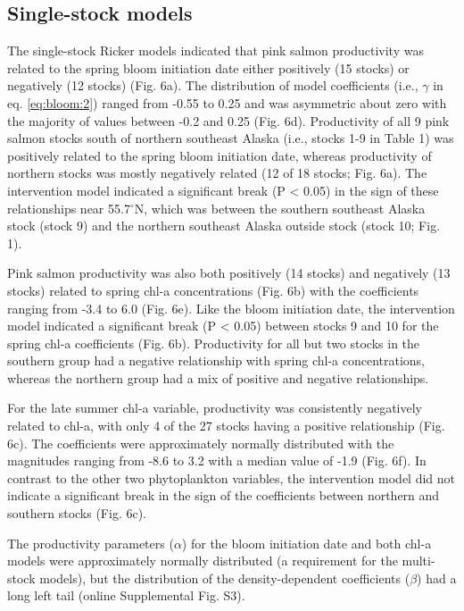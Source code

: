 \subsection{Single-stock models}

The single-stock Ricker models indicated that pink salmon productivity was
related to the spring bloom initiation date either positively (15 stocks) or
negatively (12 stocks) (Fig. 6a). The distribution of model coefficients (i.e.,
\(\gamma\) in eq. \ref{eq:bloom:2}) ranged from -0.55 to 0.25 and was asymmetric
about zero with the majority of values between -0.2 and 0.25 (Fig. 6d).
Productivity of all 9 pink salmon stocks south of northern southeast Alaska
(i.e., stocks 1-9 in Table 1) was positively related to the spring bloom
initiation date, whereas productivity of northern stocks was mostly negatively
related (12 of 18 stocks; Fig.  6a). The intervention model indicated a
significant break (P \textless{} 0.05) in the sign of these relationships near
55.7$^{\circ}$N, which was between the southern southeast Alaska stock (stock 9)
and the northern southeast Alaska outside stock (stock 10; Fig. 1).

Pink salmon productivity was also both positively (14 stocks) and negatively (13
stocks) related to spring chl-a concentrations (Fig. 6b) with the coefficients
ranging from -3.4 to 6.0 (Fig. 6e). Like the bloom initiation date, the
intervention model indicated a significant break (P \textless{} 0.05) between
stocks 9 and 10 for the spring chl-a coefficients (Fig. 6b). Productivity for
all but two stocks in the southern group had a negative relationship with spring
chl-a concentrations, whereas the northern group had a mix of positive and
negative relationships.

For the late summer chl-a variable, productivity was consistently negatively
related to chl-a, with only 4 of the 27 stocks having a positive relationship
(Fig. 6c). The coefficients were approximately normally distributed with the
magnitudes ranging from -8.6 to 3.2 with a median value of -1.9 (Fig. 6f). In
contrast to the other two phytoplankton variables, the intervention model did
not indicate a significant break in the sign of the coefficients between
northern and southern stocks (Fig. 6c).

The productivity parameters (\(\alpha\)) for the bloom initiation date and both
chl-a models were approximately normally distributed (a requirement for the
multi-stock models), but the distribution of the density-dependent coefficients
(\(\beta\)) had a long left tail (online Supplemental Fig. S3).

